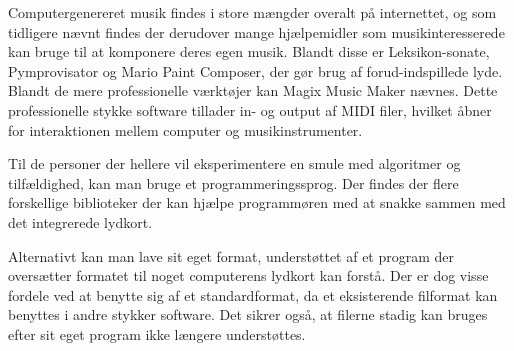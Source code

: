 Computergenereret musik findes i store mængder overalt på internettet, og som tidligere nævnt findes der derudover mange hjælpemidler som musikinteresserede kan bruge til at komponere deres egen musik.
Blandt disse er  Leksikon-sonate, Pymprovisator og  Mario Paint Composer, der gør brug af forud-indspillede lyde.
Blandt de mere professionelle værktøjer kan  Magix Music Maker nævnes.
Dette professionelle stykke software tillader in- og output af MIDI filer, hvilket åbner for interaktionen mellem computer og musikinstrumenter. \cite{CitationNeeded} 

Til de personer der hellere vil eksperimentere en smule med algoritmer og tilfældighed, kan man bruge et programmeringssprog.
Der findes der flere forskellige biblioteker der kan hjælpe programmøren med at snakke sammen med det integrerede lydkort.


Alternativt kan man lave sit eget format, understøttet af et program der oversætter formatet til noget computerens lydkort kan forstå.
Der er dog visse fordele ved at benytte sig af et standardformat, da et eksisterende filformat kan benyttes i andre stykker software.
Det sikrer også, at filerne stadig kan bruges efter sit eget program ikke længere understøttes.